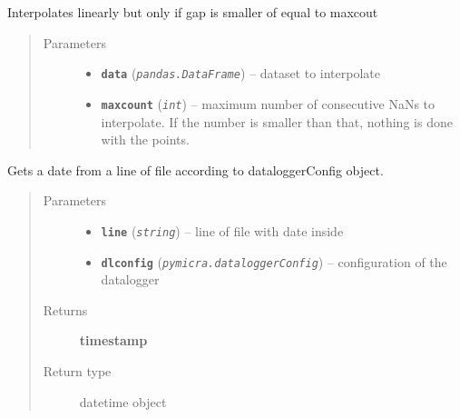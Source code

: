 \documentclass[a4paper,10pt,oneside]{sphinxmanual}
\begin{document}
\begin{fulllineitems}
\label{pymicra.algs:pymicra.algs.general.limited_interpolation}
Interpolates linearly but only if gap is smaller of equal to maxcout
\begin{quote}\begin{description}
\item[{Parameters}] \leavevmode\begin{itemize}
\item {} 
\textbf{\texttt{data}} (\emph{\texttt{pandas.DataFrame}}) -- dataset to interpolate

\item {} 
\textbf{\texttt{maxcount}} (\emph{\texttt{int}}) -- maximum number of consecutive NaNs to interpolate. If the number is smaller than that, nothing is done with the points.

\end{itemize}

\end{description}\end{quote}

\end{fulllineitems}


\begin{fulllineitems}
\label{pymicra.algs:pymicra.algs.general.line2date}
Gets a date from a line of file according to dataloggerConfig object.
\begin{quote}\begin{description}
\item[{Parameters}] \leavevmode\begin{itemize}
\item {} 
\textbf{\texttt{line}} (\emph{\texttt{string}}) -- line of file with date inside

\item {} 
\textbf{\texttt{dlconfig}} (\emph{\texttt{pymicra.dataloggerConfig}}) -- configuration of the datalogger

\end{itemize}

\item[{Returns}] \leavevmode
\textbf{timestamp}

\item[{Return type}] \leavevmode
datetime object

\end{description}\end{quote}

\end{fulllineitems}
\end{document}
